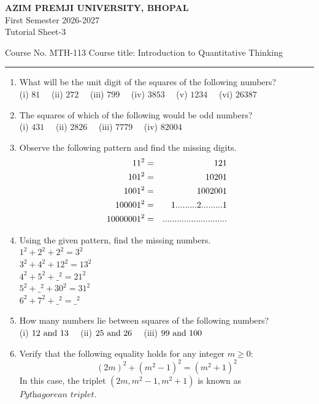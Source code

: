 \documentclass[a4paper,leqno,12pt]{amsart}
\begin{document}
\begin{center}
{{\textbf{ AZIM PREMJI UNIVERSITY, BHOPAL}\\
First Semester  2026-2027\\
Tutorial Sheet-3}}
\end{center}

\noindent Course No. MTH-113 \hfill  Course title: Introduction to Quantitative Thinking
\vspace{.3cm}
\hrule 
\vspace{.3cm}


\begin{enumerate}
\setlength\itemsep{1em}
\item What will be the unit digit of the squares of the following numbers?\\
(i) $81 \quad$ (ii) $272 \quad$ (iii) $799 \quad $ (iv) $3853 \quad $ (v) $1234 \quad $ (vi) $26387$

\item The squares of which of the following would be odd numbers? \\
(i) $431 \quad$ (ii) $2826 \quad$ (iii) $7779 \quad $ (iv) $82004$

\item Observe the following pattern and find the missing digits.
\begin{eqnarray*}
 11^2 &=& 121 \cr
 101^2 &=& 10201 \cr 
 1001^2 &=& 1002001 \cr
 100001^2 &=& 1 ......... 2 ......... 1 \cr
 10000001^2 &=& ...........................
\end{eqnarray*}

\item Using the given pattern, find the missing numbers.\\
$1^2 + 2^2 + 2^2 = 3^2$\\
$3^2 + 4^2 + 12^2 = 13^2$\\
$4^2 + 5^2 + \_^2 = 21^2$\\
$5^2 + \_^2 + 30^2 = 31^2$\\
$6^2 + 7^2 + \_^2 = \_^2$

\item How many numbers lie between squares of the following numbers?\\
(i) $12 \ {\rm and} \ 13 \quad$ (ii) $25 \ {\rm and} \ 26 \quad$ (iii) $99 \ {\rm and} \ 100$


\item Verify that the following equality holds for any integer $m \geq 0$:
\[
(2m)^2 + (m^2 - 1)^2 = (m^2 + 1)^2
\]
In this case, the triplet $(2m, m^2 -1, m^2 +1)$ is known as $\textit{Pythagorean triplet}$.


\end{enumerate}
\end{document}
